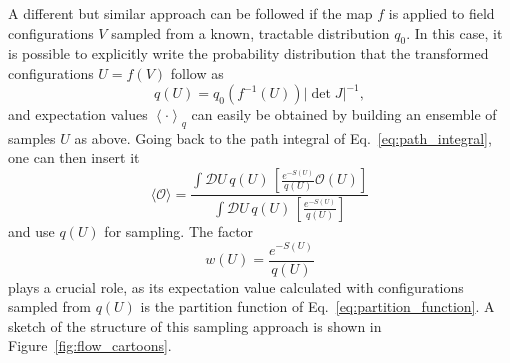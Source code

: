 \documentclass[12pt]{article}
\begin{document}
A different but similar approach can be followed if the map $f$ is applied to field configurations $V$ sampled from a known, tractable distribution $q_0$. In this case, it is possible to explicitly write the probability distribution that the transformed configurations $U = f(V)$ follow as
\begin{equation}
\label{eq:is_probability}
    q (U) = q_0 ( f^{-1}(U) ) \left| \det J \right|^{-1},
\end{equation}
and expectation values $\left< \cdot \right>_q$ can easily be obtained by building an ensemble of samples $U$ as above.
Going back to the path integral of Eq.~\eqref{eq:path_integral}, one can then insert it
\begin{equation}
\label{eq:is_path_integral}
    \langle \mathcal{O} \rangle = \frac{\int \mathcal{D} U \, q(U) \, \left[ \frac{e^{-S(U)}}{q(U)}  \mathcal{O}(U) \right]}{\int \mathcal{D} U \, q(U) \, \left[ \frac{e^{-S(U)}}{q(U)} \right]}
\end{equation}
and use $q(U)$ for sampling. The factor
\begin{equation}
    w(U) = \frac{e^{-S(U)}}{q(U)}
\end{equation}
plays a crucial role, as its expectation value calculated with configurations sampled from $q(U)$ is the partition function of Eq.~\eqref{eq:partition_function}. A sketch of the structure of this sampling approach is shown in Figure~\ref{fig:flow_cartoons}.
\end{document}
